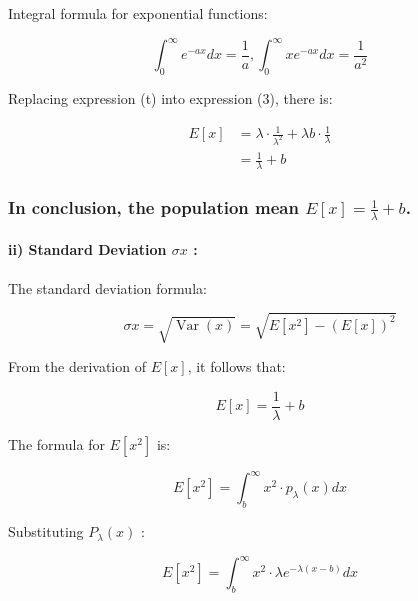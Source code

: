 \documentclass[
]{article}
\begin{document}
Integral formula for exponential functions:

\[
\begin{equation*}
\int_{0}^{\infty} e^{-a x} d x=\frac{1}{a}, \int_{0}^{\infty} x e^{-a x} d x=\frac{1}{a^{2}} \tag{4}
\end{equation*}
\]

Replacing expression (t) into expression (3), there is:

\[
\begin{aligned}
E[x] & =\lambda \cdot \frac{1}{\lambda^{2}}+\lambda b \cdot \frac{1}{\lambda} \\
& =\frac{1}{\lambda}+b
\end{aligned}
\]

\subsubsection{\texorpdfstring{In conclusion, the population mean
\(E[x]=\frac{1}{\lambda}+b\).}{In conclusion, the population mean E{[}x{]}=\textbackslash frac\{1\}\{\textbackslash lambda\}+b.}}\label{in-conclusion-the-population-mean-exfrac1lambdab.}

\paragraph{\texorpdfstring{ii) Standard Deviation \(\sigma x\)
:}{ii) Standard Deviation \textbackslash sigma x :}}\label{ii-standard-deviation-sigma-x}

The standard deviation formula:

\[
\begin{equation*}
\sigma x=\sqrt{\operatorname{Var}(x)}=\sqrt{E\left[x^{2}\right]-(E[x])^{2}} \tag{1}
\end{equation*}
\]

From the derivation of \(E[x]\), it follows that:

\[
E[x]=\frac{1}{\lambda}+b \tag{2}
\]

The formula for \(E\left[x^{2}\right]\) is:

\[
\begin{equation*}
E\left[x^{2}\right]=\int_{b}^{\infty} x^{2} \cdot p_{\lambda}(x) d x \tag{3}
\end{equation*}
\]

Substituting \(P_{\lambda}(x)\) :

\[
\begin{equation*}
E\left[x^{2}\right]=\int_{b}^{\infty} x^{2} \cdot \lambda e^{-\lambda(x-b)} d x \tag{4}
\end{equation*}
\]
\end{document}
